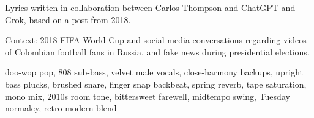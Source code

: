 
\begin{notes}
Lyrics written in collaboration between Carlos Thompson and ChatGPT and Grok, based on a post from 2018.

Context: 2018 FIFA World Cup and social media conversations regarding videos of Colombian football fans in Russia, and fake news during presidential elections.
\end{notes}
\begin{style}
doo-wop pop, 808 sub-bass, velvet male vocals, close-harmony backups, upright bass plucks, brushed snare, finger snap backbeat, spring reverb, tape saturation, mono mix, 2010s room tone, bittersweet farewell, midtempo swing, Tuesday normalcy, retro modern blend
\end{style}
